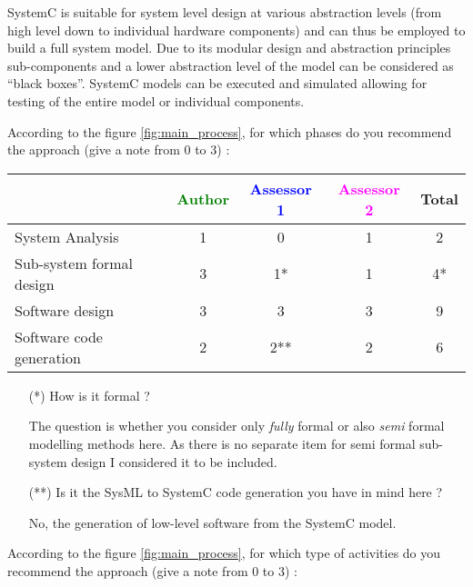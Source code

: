 SystemC is suitable for system level design at various abstraction levels (from high level down to individual hardware components) and can thus be employed to build a full system model. Due to its modular design and abstraction principles sub-components and a lower abstraction level of the model can be considered as ``black boxes''. SystemC models can be executed and simulated allowing for testing of the entire model or individual components.

According to the figure \ref{fig:main_process}, for which phases do you recommend the approach (give a note from 0 to 3) :

\begin{tabular}{|l | c | c | c | c|}
\hline
& \textcolor{green}{Author} & \textcolor{blue}{Assessor 1} & \textcolor{magenta}{Assessor 2} & Total \\
\hline
System Analysis &1 & 0 & 1 & 2 \\
\hline
Sub-system formal design & 3 & 1*  &  1 & 4* \\
\hline
Software design &3 &3 & 3 & 9 \\
\hline
Software code generation &2 & 2** & 2 & 6 \\
\hline
\end{tabular}
\begin{assessor1}
\begin{itemize}
\item[(*)] How is it formal ?
\begin{author_comment}
The question is whether you consider only \emph{fully} formal or also \emph{semi} formal modelling methods here. As there is no separate item for semi formal sub-system design I considered it to be included.
\end{author_comment}
\item[(**)] Is it the SysML to  SystemC code generation  you have in
  mind here ?
\begin{author_comment}
No, the generation of low-level software from the SystemC model.
\end{author_comment}
\end{itemize}
\end{assessor1}

According to the figure \ref{fig:main_process}, for which type of activities do you recommend the approach (give a note from 0 to 3) :

